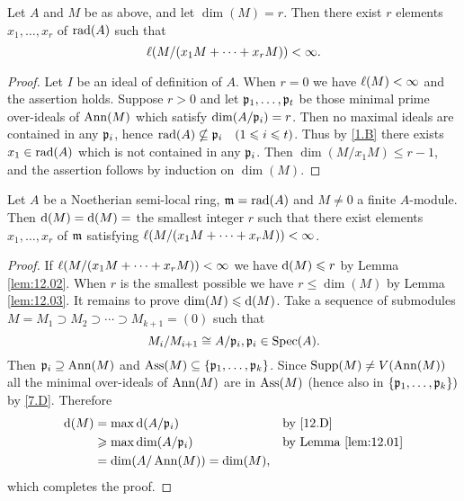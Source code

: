 \documentclass[../main]{subfiles}
\begin{document}
\begin{parlemma}\label{lem:12.03}
Let $A$ and $M$ be as above, and let $\dim(M)=r$. Then there exist $r$ elements $x_1, \ldots, x_r$ of $\operatorname{rad}(A)$ such that \[\ell(M / (x_1 M+\cdots+x_r M))<\infty.\]
\end{parlemma}

\begin{proof}
Let $I$ be an ideal of definition of $A$. When $r=0$ we have $\ell(M)<\infty$ and the assertion holds. Suppose $r>0$ and let $\mathfrak{p}_1, \dots, \mathfrak{p}_t$ be those minimal prime over-ideals of $\operatorname{Ann}(M)$ which satisfy $\operatorname{dim}(A / \mathfrak{p}_i)=r$. Then no maximal ideals are contained in any $\mathfrak{p}_i$, hence $\rad(A) \nsubseteq \ideal{p}_i\for{1 \leqslant i \leqslant t}$. Thus by \ref{1.B} there exists $x_1 \in \operatorname{rad}(A)$ which is not contained in any $\mathfrak{p}_i$. Then $\dim(M / x_1 M) \leqslant r-1$, and the assertion follows by induction on $\dim(M)$.
\end{proof}

\begin{partheorem}\label{thm:017}
Let $A$ be a Noetherian semi-local ring, $\mathfrak{m}=\operatorname{rad}(A)$ and $M \neq 0$ a finite $A$-module. Then $\mathrm{d}(M)=\mathrm{d}(M)=$ the smallest integer $r$ such that there exist elements $x_1,\ldots, x_r$ of $\mathfrak{m}$ satisfying $\ell(M / (x_1 M+\cdots+x_r M))<\infty$.
\end{partheorem}

\begin{proof}
If $\ell(M / (x_1 M+\cdots+x_r M))<\infty$ we have $\mathrm{d}(M)\leqslant r$ by Lemma \ref{lem:12.02}. When $r$ is the smallest possible we have $r \leqslant \dim(M)$ by Lemma \ref{lem:12.03}. It remains to prove $\operatorname{dim}(M) \leqslant \mathrm{d}(M)$. Take a sequence of submodules $M=M_1\supset M_2 \supset \cdots \supset M_{k+1}=(0)$ such that \[M_i / M_{i+1} \cong A / \mathfrak{p}_i, \mathfrak{p}_i \in \operatorname{Spec}(A).\] Then $\mathfrak{p}_i \supseteq\operatorname{Ann}(M)$ and $\operatorname{Ass}(M)\subseteq\{\mathfrak{p}_1, \dots, \mathfrak{p}_k\}$. Since $\operatorname{Supp}(M) \neq V(\operatorname{Ann}(M))$ all the minimal over-ideals of $\operatorname{Ann}(M)$ are in $\operatorname{Ass}(M)$ (hence also in $\{\mathfrak{p}_1, \dots, \mathfrak{p}_k\})$ by \ref{7.D}. Therefore
\begin{align*}
    \mathrm{d}(M)&=\max\mathrm{d}(A/\mathfrak{p}_i) & &\text{by \ref{12.D}}\\
    &\geqslant\max\operatorname{dim}(A/\mathfrak{p}_i) & &\text{by Lemma \ref{lem:12.01}}\\
    &=\operatorname{dim}(A/\operatorname{Ann}(M))=\operatorname{dim}(M), & &
\end{align*}
which completes the proof.
\end{proof} 
\end{document}
